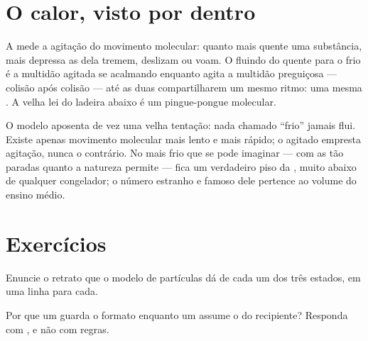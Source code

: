 \section{O calor, visto por dentro}

\begin{proposition}\label{prop:g7:states-of-matter:temperature}
A  mede a agitação do movimento molecular: quanto mais
quente uma substância, mais depressa as  dela tremem,
deslizam ou voam. O  fluindo do quente para o frio é a multidão
agitada se acalmando enquanto agita a multidão preguiçosa ---
colisão após colisão --- até as duas compartilharem um mesmo ritmo:
uma mesma . A velha lei do  ladeira abaixo é um
pingue-pongue molecular.
\end{proposition}

\begin{example}\label{ex:g7:states-of-matter:cold}
O modelo aposenta de vez uma velha tentação: nada chamado ``frio''
jamais flui. Existe apenas movimento molecular mais lento e mais
rápido; o agitado empresta agitação, nunca o contrário. No mais frio
que se pode imaginar --- com as  tão paradas quanto a
natureza permite --- fica um verdadeiro piso da , muito
abaixo de qualquer congelador; o número estranho e famoso dele
pertence ao volume do ensino médio.
\end{example}

\section{Exercícios}

\begin{exercise}[$\star$]\label{exo:g7:states-of-matter:1}
Enuncie o retrato que o modelo de partículas dá de cada um dos três
estados, em uma linha para cada.
\end{exercise}

\begin{exercise}[$\star$]\label{exo:g7:states-of-matter:2}
Por que um  guarda o formato enquanto um  assume o do
recipiente? Responda com , e não com regras.
\end{exercise}

